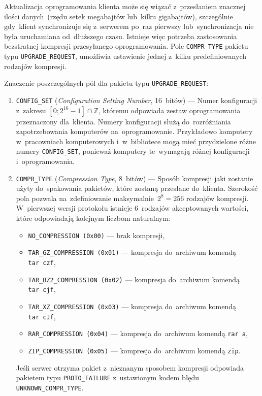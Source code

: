 \documentclass[thesis]{subfiles}
\begin{document}
Aktualizacja oprogramowania klienta może się wiązać z~przesłaniem znacznej ilości danych~(rzędu setek megabajtów lub~kilku gigabajtów), szczególnie gdy~klient synchronizuje się z~serwerem po~raz pierwszy lub~synchronizacja nie była uruchamiana od~dłuższego czasu. Istnieje więc potrzeba zastosowania bezstratnej kompresji przesyłanego oprogramowania. Pole \texttt{COMPR\_TYPE} pakietu typu \texttt{UPGRADE\_REQUEST}, umożliwia ustawienie jednej z~kilku predefiniowanych rodzajów kompresji.

Znaczenie poszczególnych pól dla pakietu typu \texttt{UPGRADE\_REQUEST}:\mynobreakpar
\begin{enumerate}
	\item \texttt{CONFIG\_SET} (\emph{Configuration Setting Number}, 16~bitów) --- Numer konfiguracji z~zakresu $[0;2^{16}-1]\cap\mathbb{Z}$, któremu odpowiada zestaw oprogramowania przeznaczony dla~klienta. Numery konfiguracji służą do~rozróżniania zapotrzebowania komputerów na~oprogramowanie. Przykładowo komputery w~pracowniach komputerowych i~w~bibliotece mogą mieć przydzielone różne numery \texttt{CONFIG\_SET}, ponieważ komputery te~wymagają różnej konfiguracji i~oprogramowania.
	\item \texttt{COMPR\_TYPE} (\emph{Compression Type}, 8~bitów) --- Sposób kompresji jaki zostanie użyty do~spakowania pakietów, które zostaną przesłane do~klienta. Szerokość pola pozwala na~zdefiniowanie maksymalnie~$2^8=256$ rodzajów kompresji. W~pierwszej wersji protokołu istnieje 6~rodzajów akceptowanych wartości, które odpowiadają kolejnym liczbom naturalnym:
		\begin{itemize}
			\item \texttt{NO\_COMPRESSION (0x00)} --- brak kompresji,
			\item \texttt{TAR\_GZ\_COMPRESSION (0x01)} --- kompresja do~archiwum  komendą \texttt{tar~czf},
			\item \texttt{TAR\_BZ2\_COMPRESSION (0x02)} --- kompresja do~archiwum  komendą \texttt{tar~cjf},
			\item \texttt{TAR\_XZ\_COMPRESSION (0x03)} --- kompresja do~archiwum  komendą \texttt{tar~cJf},
			\item \texttt{RAR\_COMPRESSION (0x04)} --- kompresja do~archiwum  komendą \texttt{rar~a},
			\item \texttt{ZIP\_COMPRESSION (0x05)} --- kompresja do~archiwum  komendą \texttt{zip}.
		\end{itemize}
	Jeśli serwer otrzyma pakiet z~nieznanym sposobem kompresji odpowiada pakietem typu \texttt{PROTO\_FAILURE} z~ustawionym kodem błędu \texttt{UNKNOWN\_COMPR\_TYPE}.

\end{enumerate}
\end{document}
